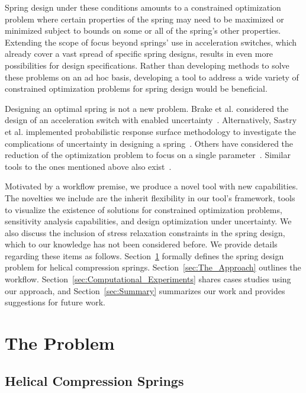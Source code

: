 \documentclass[10pt]{article}
\begin{document}
Spring design under these conditions amounts to a constrained optimization problem where certain properties of the spring may need to be maximized or minimized subject to bounds on some or all of the spring's other properties. Extending the scope of focus beyond springs' use in acceleration switches, which already cover a vast spread of specific spring designs, results in even more possibilities for design specifications. Rather than developing methods to solve these problems on an ad hoc basis, developing a tool to address a wide variety of constrained optimization problems for spring design would be beneficial. 

Designing an optimal spring is not a new problem. Brake et al. considered the design of an acceleration switch with enabled uncertainty~\cite{IMSM2010}. Alternatively, Sastry et al. implemented probabilistic response surface methodology to investigate the complications of uncertainty in designing a spring~\cite{Reliability}. Others have considered the reduction of the optimization problem to focus on a single parameter~\cite{Robust}. Similar tools to the ones mentioned above also exist~\cite{Paredes}.

Motivated by a workflow premise, we produce a novel tool with new capabilities. The novelties we include are the inherit flexibility in our tool's framework, tools to visualize the existence of solutions for constrained optimization problems, sensitivity analysis capabilities, and design optimization under uncertainty. We also discuss the inclusion of stress relaxation constraints in the spring design, which to our knowledge has not been considered before. We provide details regarding these items as follows. Section~\ref{sec:The_Problem} formally defines the spring design problem for helical compression springs. Section~\ref{sec:The_Approach} outlines the workflow. Section~\ref{sec:Computational_Experiments} shares cases studies using our approach, and Section~\ref{sec:Summary} summarizes our work and provides suggestions for future work.

			
\section{The Problem} 
\label{sec:The_Problem}

\subsection{Helical Compression Springs}
\label{sec:Springs}
\end{document}
